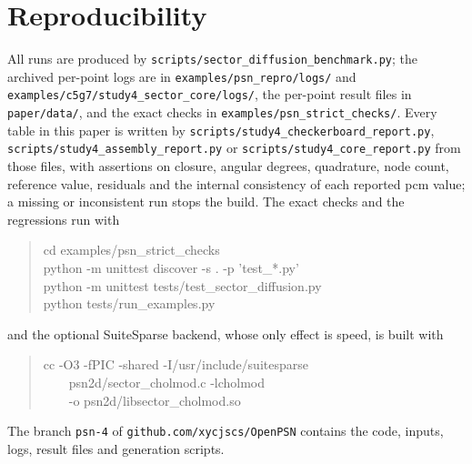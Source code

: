 \documentclass[11pt,a4paper]{article}
\begin{document}
\section*{Reproducibility}
All runs are produced by \texttt{scripts/sector\_diffusion\_benchmark.py}; the archived
per-point logs are in \texttt{examples/psn\_repro/logs/} and
\texttt{examples/c5g7/study4\_sector\_core/logs/}, the per-point result files in
\texttt{paper/data/}, and the exact checks in \texttt{examples/psn\_strict\_checks/}.
Every table in this paper is written by
\texttt{scripts/\allowbreak study4\_\allowbreak checkerboard\_\allowbreak report.py},
\texttt{scripts/\allowbreak study4\_\allowbreak assembly\_\allowbreak report.py} or
\texttt{scripts/\allowbreak study4\_\allowbreak core\_\allowbreak report.py}
from those files, with assertions on closure, angular degrees, quadrature, node count,
reference value, residuals and the internal consistency of each reported pcm value; a
missing or inconsistent run stops the build. The exact checks and the regressions run
with
\begin{quote}\small\ttfamily
cd examples/psn\_strict\_checks\\
python -m unittest discover -s . -p 'test\_*.py'\\
python -m unittest tests/test\_sector\_diffusion.py\\
python tests/run\_examples.py
\end{quote}
and the optional SuiteSparse backend, whose only effect is speed, is built with
\begin{quote}\small\ttfamily
cc -O3 -fPIC -shared -I/usr/include/suitesparse \\
\ \ \ \ psn2d/sector\_cholmod.c -lcholmod \\
\ \ \ \ -o psn2d/libsector\_cholmod.so
\end{quote}
The branch \texttt{psn-4} of
\texttt{github.com/xycjscs/OpenPSN} contains the code, inputs, logs, result files and
generation scripts.
\end{document}
